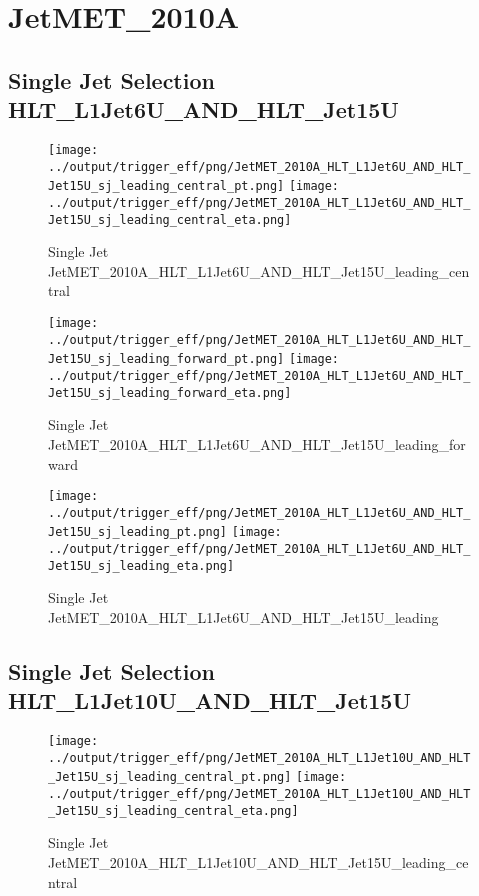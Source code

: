 \documentclass[11pt]{article}
\begin{document}
\newpage
\section{JetMET\_2010A}


\subsection{Single Jet Selection HLT\_L1Jet6U\_AND\_HLT\_Jet15U}
\begin{figure}[ht]
\centering
\texttt{[image: ../output/trigger\_eff/png/JetMET\_2010A\_HLT\_L1Jet6U\_AND\_HLT\_Jet15U\_sj\_leading\_central\_pt.png]}
\texttt{[image: ../output/trigger\_eff/png/JetMET\_2010A\_HLT\_L1Jet6U\_AND\_HLT\_Jet15U\_sj\_leading\_central\_eta.png]}
\caption{Single Jet JetMET\_2010A\_HLT\_L1Jet6U\_AND\_HLT\_Jet15U\_leading\_central}
\label{fig:jetmet_sj_L1Jet6U_AND_HLT_Jet15U_leading_central}
\end{figure}

\begin{figure}[ht]
\centering
\texttt{[image: ../output/trigger\_eff/png/JetMET\_2010A\_HLT\_L1Jet6U\_AND\_HLT\_Jet15U\_sj\_leading\_forward\_pt.png]}
\texttt{[image: ../output/trigger\_eff/png/JetMET\_2010A\_HLT\_L1Jet6U\_AND\_HLT\_Jet15U\_sj\_leading\_forward\_eta.png]}
\caption{Single Jet JetMET\_2010A\_HLT\_L1Jet6U\_AND\_HLT\_Jet15U\_leading\_forward}
\label{fig:jetmet_sj_L1Jet6U_AND_HLT_Jet15U_leading_forward}
\end{figure}

\begin{figure}[ht]
\centering
\texttt{[image: ../output/trigger\_eff/png/JetMET\_2010A\_HLT\_L1Jet6U\_AND\_HLT\_Jet15U\_sj\_leading\_pt.png]}
\texttt{[image: ../output/trigger\_eff/png/JetMET\_2010A\_HLT\_L1Jet6U\_AND\_HLT\_Jet15U\_sj\_leading\_eta.png]}
\caption{Single Jet JetMET\_2010A\_HLT\_L1Jet6U\_AND\_HLT\_Jet15U\_leading}
\label{fig:jetmet_sj_L1Jet6U_AND_HLT_Jet15U_leading}
\end{figure}


\newpage
\subsection{Single Jet Selection HLT\_L1Jet10U\_AND\_HLT\_Jet15U}
\begin{figure}[ht]
\centering
\texttt{[image: ../output/trigger\_eff/png/JetMET\_2010A\_HLT\_L1Jet10U\_AND\_HLT\_Jet15U\_sj\_leading\_central\_pt.png]}
\texttt{[image: ../output/trigger\_eff/png/JetMET\_2010A\_HLT\_L1Jet10U\_AND\_HLT\_Jet15U\_sj\_leading\_central\_eta.png]}
\caption{Single Jet JetMET\_2010A\_HLT\_L1Jet10U\_AND\_HLT\_Jet15U\_leading\_central}
\label{fig:jetmet_sj_L1Jet10U_AND_HLT_Jet15U_leading_central}
\end{figure}
\end{document}
